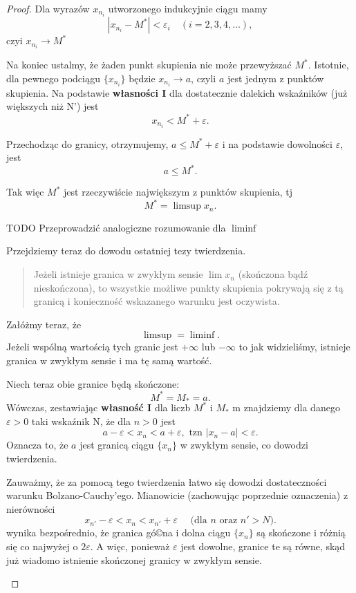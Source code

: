 \begin{proof}
	 Dla wyrazów $x_{n_{i}}$ utworzonego indukcyjnie ciągu mamy
	 \[
	 \left| x_{n_{i}}-M^{\ast} \right| < \varepsilon_{i} \quad \left( i=2,3,4,\ldots \right) 
	 ,\] 
	 czyi $x_{n_{i}}\to M^{\ast}$

	 Na koniec ustalmy, że żaden punkt skupienia nie może przewyższać $M^{*}$. Istotnie, dla pewnego podciągu $\{x_{n_{i}}\} $ będzie $x_{n_{i}}\to a$, czyli $a$ jest jednym z punktów skupienia. Na podstawie \textbf{własności I} dla dostatecznie dalekich wskaźników (już większych niż N') jest
	 \[
	 x_{n_{i}}< M^{*}+\varepsilon
	 .\] 

	 Przechodząc do granicy, otrzymujemy, $a\le M^{*} +\varepsilon$ i na podstawie dowolności $\varepsilon$, jest
	 \[
	 a\le M^{*}
	 .\] 

	 Tak więc $M^{*}$ jest rzeczywiście największym z punktów skupienia, tj
	 \[
	 M^{*} = \limsup x_{n} 
	 .\] 
\begin{goal}
	TODO Przeprowadzić analogiczne rozumowanie dla $\liminf$
\end{goal} 

Przejdziemy teraz do dowodu ostatniej tezy twierdzenia. 
\begin{quote}
	Jeżeli istnieje granica w zwykłym sensie $\lim x_{n}$ (skończona bądź nieskończona), to wszystkie możliwe punkty skupienia pokrywają się z tą granicą i konieczność wskazanego warunku jest oczywista.
\end{quote} 

	Załóżmy teraz, że
	\[
	\limsup = \liminf
.\] 
Jeżeli wspólną wartością tych granic jest $+\infty$ lub $-\infty$ to jak widzieliśmy, istnieje granica w zwykłym sensie i ma tę samą wartość.

Niech teraz obie granice będą skończone:
\[
M^{*} = M_{*} = a
.\] 
Wówczas, zestawiając \textbf{własność I} dla liczb $M^{*}$ i $M_{*}$ m znajdziemy dla danego $\varepsilon>0$ taki wskaźnik N, że dla $n>0$ jest \[
a-\varepsilon < x_{n}< a+\varepsilon, \text{ tzn } \left| x_{n}-a \right| < \varepsilon 
.\] 
Oznacza to, że $a$ jest granicą ciągu $\{x_{n}\} $ w zwykłym sensie, co dowodzi twierdzenia.

\begin{remark}
	Zauważmy, że za pomocą tego twierdzenia łatwo się dowodzi dostateczności warunku Bolzano-Cauchy'ego. Mianowicie (zachowując poprzednie oznaczenia) z nierówności
	\[
	x_{n'} - \varepsilon < x_{n} < x_{n'}+\varepsilon \quad \text{ (dla } n \text{ oraz } n'>N)
	.\] 
	wynika bezpośrednio, że granica gó©na i dolna ciągu $\{x_{n}\} $ są skończone i różnią się co najwyżej o $2\varepsilon$. A więc, ponieważ $\varepsilon$ jest dowolne, granice te są równe, skąd już wiadomo istnienie skończonej granicy w zwykłym sensie.
\end{remark} 
\end{proof} 



